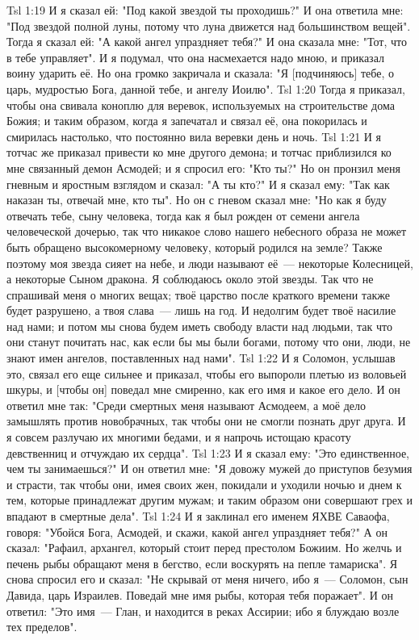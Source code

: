 \vs Tsl 1:19 
И я сказал ей: "Под какой звездой ты проходишь?" И она ответила мне: "Под звездой полной луны, потому что луна движется над большинством вещей". Тогда я сказал ей: "А какой ангел упраздняет тебя?" И она сказала мне: "Тот, что в тебе управляет". И я подумал, что она насмехается надо мною, и приказал воину ударить её. Но она громко закричала и сказала: "Я [подчиняюсь] тебе, о царь, мудростью Бога, данной тебе, и ангелу Иоилю".
\vs Tsl 1:20 
Тогда я приказал, чтобы она свивала коноплю для веревок, используемых на строительстве дома Божия; и таким образом, когда я запечатал и связал её, она покорилась и смирилась настолько, что постоянно вила веревки день и ночь.
\vs Tsl 1:21 
И я тотчас же приказал привести ко мне другого демона; и тотчас приблизился ко мне связанный демон Асмодей; и я спросил его: "Кто ты?" Но он пронзил меня гневным и яростным взглядом и сказал: "А ты кто?" И я сказал ему: "Так как наказан ты, отвечай мне, кто ты". Но он с гневом сказал мне: "Но как я буду отвечать тебе, сыну человека, тогда как я был рожден от семени ангела человеческой дочерью, так что никакое слово нашего небесного образа не может быть обращено высокомерному человеку, который родился на земле? Также поэтому моя звезда сияет на небе, и люди называют её~--- некоторые Колесницей, а некоторые Сыном дракона. Я соблюдаюсь около этой звезды. Так что не спрашивай меня о многих вещах; твоё царство после краткого времени также будет разрушено, а твоя слава~--- лишь на год. И недолгим будет твоё насилие над нами; и потом мы снова будем иметь свободу власти над людьми, так что они станут почитать нас, как если бы мы были богами, потому что они, люди, не знают имен ангелов, поставленных над нами".
\vs Tsl 1:22 
И я Соломон, услышав это, связал его еще сильнее и приказал, чтобы его выпороли плетью из воловьей шкуры, и [чтобы он] поведал мне смиренно, как его имя и какое его дело. И он ответил мне так: "Среди смертных меня называют Асмодеем, а моё дело замышлять против новобрачных, так чтобы они не смогли познать друг друга. И я совсем разлучаю их многими бедами, и я напрочь истощаю красоту девственниц и отчуждаю их сердца".
\vs Tsl 1:23 
И я сказал ему: "Это единственное, чем ты занимаешься?" И он ответил мне: "Я довожу мужей до приступов безумия и страсти, так чтобы они, имея своих жен, покидали и уходили ночью и днем к тем, которые принадлежат другим мужам; и таким образом они совершают грех и впадают в смертные дела".
\vs Tsl 1:24 
И я заклинал его именем ЯХВЕ Саваофа, говоря: "Убойся Бога, Асмодей, и скажи, какой ангел упраздняет тебя?" А он сказал: "Рафаил, архангел, который стоит перед престолом Божиим. Но желчь и печень рыбы обращают меня в бегство, если воскурять на пепле тамариска". Я снова спросил его и сказал: "Не скрывай от меня ничего, ибо я~--- Соломон, сын Давида, царь Израилев. Поведай мне имя рыбы, которая тебя поражает". И он ответил: "Это имя~--- Глан, и находится в реках Ассирии; ибо я блуждаю возле тех пределов".
